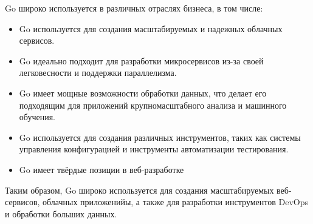 Go широко используется в различных отраслях бизнеса\cite{TPROGER_WHY_GO}, в том числе:

\begin{itemize}
    \item Go используется для создания масштабируемых и надежных облачных сервисов.
    \item Go идеально подходит для разработки микросервисов из-за своей легковесности и поддержки параллелизма.
    \item Go имеет мощные возможности обработки данных, что делает его подходящим для приложений крупномасштабного анализа и машинного обучения.
    \item Go используется для создания различных инструментов, таких как системы управления конфигурацией и инструменты автоматизации тестирования.
    \item Go имеет твёрдые позиции в веб-разработке
\end{itemize}

Таким образом, Go широко используется для создания масштабируемых веб-сервисов, облачных приложенийы, а также для разработки инструментов DevOps и обработки больших данных.

